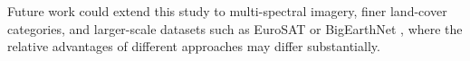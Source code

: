 \documentclass[12pt, a4paper]{article}
\begin{document}
Future work could extend this study to multi-spectral imagery, finer land-cover categories, and larger-scale datasets such as EuroSAT \cite{eurosat} or BigEarthNet \cite{bigearthnet}, where the relative advantages of different approaches may differ substantially.



\end{document}
